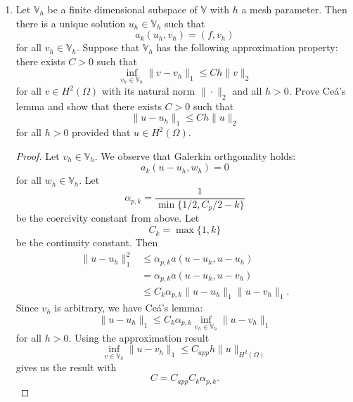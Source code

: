 \documentclass{article}
\begin{document}
\begin{enumerate}
\begin{enumerate}
		      \item
		            Let $\mathbb V_h$ be a finite dimensional subspace of $\mathbb V$ with $h$ a mesh parameter.
		            Then there is a unique solution $u_h \in \mathbb V_h$ such that \[a_k(u_h,v_h) = (f,v_h)\] for all $v_h \in \mathbb V_h$.
		            Suppose that $\mathbb V_h$ has the following approximation property: there exists $C > 0$ such that \[\inf_{v_h \in \mathbb V_h}\|v-v_h\|_1 \leq Ch\|v\|_2\] for all $v \in H^2(\Omega)$ with its natural norm $\|\cdot\|_2$ and all $h > 0$.
		            Prove Ce\'a's lemma and show that there exists $C > 0$ such that \[\|u-u_h\|_1 \leq Ch\|u\|_2\] for all $h > 0$ provided that $u \in H^2(\Omega)$.
		            \begin{proof}
			            Let $v_h \in \mathbb V_h$.
			            We observe that Galerkin orthgonality holds: \[a_k(u-u_h,w_h) = 0\] for all $w_h \in \mathbb V_h$.
			            Let \[\alpha_{p,k} = \frac{1}{\min\{1/2,C_p/2-k\}}\] be the coercivity constant from above.
			            Let \[C_k = \max\{1,k\}\] be the continuity constant.
			            Then
			            \begin{align*}
				            \|u-u_h\|_1^2 & \leq \alpha_{p,k} a(u-u_h,u-u_h)             \\
				                          & = \alpha_{p,k} a(u-u_h,u-v_h)                \\
				                          & \leq C_k\alpha_{p,k} \|u-u_h\|_1\|u-v_h\|_1.
			            \end{align*}
			            Since $v_h$ is arbitrary, we have Ce\'a's lemma: \[\|u-u_h\|_1 \leq C_k\alpha_{p,k}\inf_{v_h\in\mathbb V_h}\|u-v_h\|_1\] for all $h > 0$.
			            Using the approximation result \[\inf_{v\in \mathbb V_h}\|u-v_h\|_1 \leq C_{app}h\|u\|_{H^2(\Omega)}\] gives us the result with \[C = C_{app}C_k\alpha_{p,k}.\]
		            \end{proof}


\end{enumerate}
\end{enumerate}
\end{document}
